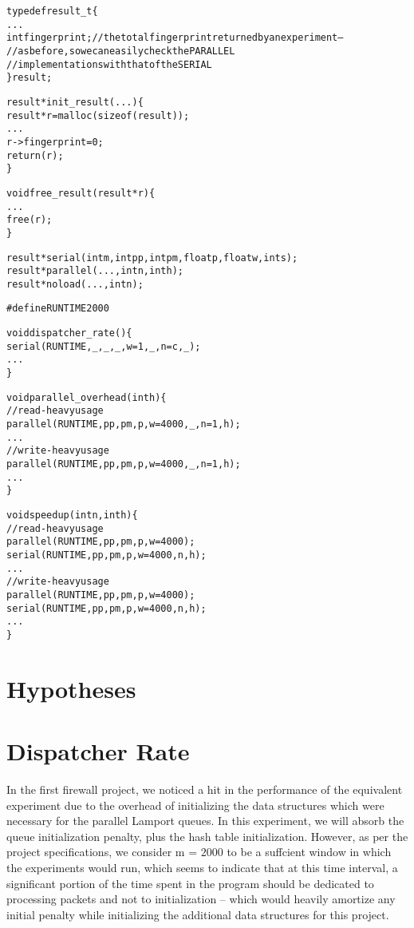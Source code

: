 \documentclass{article}
\newcommand{\code}[1]{\texttt{$\text{#1}$}}
\begin{document}
\begin{alltt}

typedef result_t \{
  ...
  int fingerprint;      // the total fingerprint returned by an experiment --
                        //   as before, so we can easily check the PARALLEL
                        //   implementations with that of the SERIAL
\} result;

result *init_result(...) \{
  result *r = malloc(sizeof(result));
  ...
  r->fingerprint = 0;
  return(r);
\}

void free_result(result *r) \{
  ...
  free(r);
\}

result *serial(int m, int pp, int pm, float p, float w, int s);
result *parallel(..., int n, int h);
result *noload(..., int n);

#define RUNTIME 2000

void dispatcher_rate() \{
  serial(RUNTIME, _, _, _, w = 1, _, n = c, _);
  ...
\}

void parallel_overhead(int h) \{
  // read-heavy usage
  parallel(RUNTIME, pp, pm, p, w = 4000, _, n = 1, h);
  ...
  // write-heavy usage
  parallel(RUNTIME, pp, pm, p, w = 4000, _, n = 1, h);
  ...
\}

void speedup(int n, int h) \{
  // read-heavy usage
  parallel(RUNTIME, pp, pm, p, w = 4000);
  serial(RUNTIME, pp, pm, p, w = 4000, n, h);
  ...
  // write-heavy usage
  parallel(RUNTIME, pp, pm, p, w = 4000);
  serial(RUNTIME, pp, pm, p, w = 4000, n, h);
  ...
\}

\end{alltt}

\section{Hypotheses}

\section{Dispatcher Rate}

In the first firewall project, we noticed a hit in the performance of the equivalent experiment due to the overhead of initializing the data structures which were 
necessary for the parallel Lamport queues. In this experiment, we will absorb the queue initialization penalty, plus the hash table initialization. However, as per 
the project specifications, we consider \code{m = 2000} to be a suffcient window in which the experiments would run, which seems to indicate that at this time 
interval, a significant portion of the time spent in the program should be dedicated to processing packets and not to initialization -- which would heavily amortize 
any initial penalty while initializing the additional data structures for this project.
\end{document}
